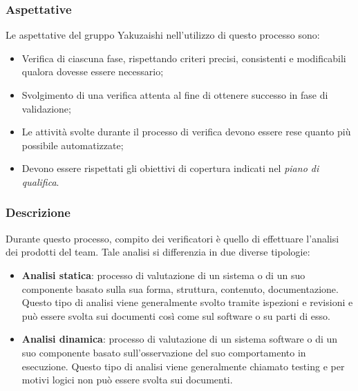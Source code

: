     \subsubsection{Aspettative}
    Le aspettative del gruppo Yakuzaishi nell’utilizzo di questo processo sono:
    \begin{itemize}
        \item Verifica di ciascuna fase, rispettando criteri precisi, consistenti e modificabili qualora dovesse essere necessario;
        \item Svolgimento di una verifica attenta al fine di ottenere successo in fase di validazione;
        \item Le attività svolte durante il processo di verifica devono essere rese quanto più possibile automatizzate;
        \item Devono essere rispettati gli obiettivi di copertura indicati nel \textit{piano di qualifica}.
    \end{itemize}

    \subsubsection{Descrizione}
    Durante questo processo, compito dei verificatori è quello di effettuare l'analisi dei prodotti del team. Tale analisi si differenzia in due diverse tipologie:
    \begin{itemize}
        \item \textbf{Analisi statica}: processo di valutazione di un sistema o di un suo componente basato sulla sua forma, struttura, contenuto, documentazione. Questo tipo di analisi viene generalmente svolto tramite ispezioni e revisioni e può essere svolta sui documenti così come sul software o su parti di esso.
        \item \textbf{Analisi dinamica}: processo di valutazione di un sistema software o di un suo componente basato sull'osservazione del suo comportamento in esecuzione. Questo tipo di analisi viene generalmente chiamato testing e per motivi logici non può essere svolta sui documenti.
    \end{itemize}

